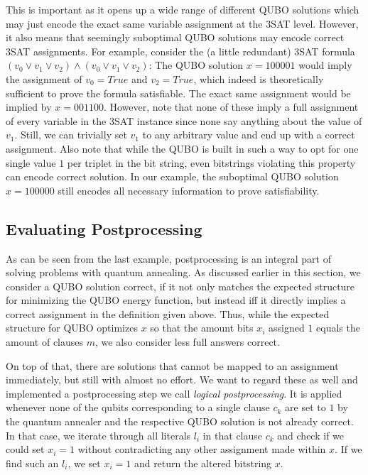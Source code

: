 This is important as it opens up a wide range of different QUBO solutions which may just encode the exact same variable assignment at the 3SAT level. However, it also means that seemingly suboptimal QUBO solutions may encode correct 3SAT assignments. For example, consider the (a little redundant) 3SAT formula $(v_0 \lor v_1 \lor v_2) \land (v_0 \lor v_1 \lor v_2)$: The QUBO solution $x = 100001$ would imply the assignment of $v_0 = \textit{True}$ and $v_2 = \textit{True}$, which indeed is theoretically sufficient to prove the formula satisfiable. The exact same assignment would be implied by $x = 001100$. However, note that none of these imply a full assignment of every variable in the 3SAT instance since none say anything about the value of $v_1$. Still, we can trivially set $v_1$ to any arbitrary value and end up with a correct assignment. Also note that while the QUBO is built in such a way to opt for one single value $1$ per triplet in the bit string, even bitstrings violating this property can encode correct solution. In our example, the suboptimal QUBO solution $x=100000$ still encodes all necessary information to prove satisfiability.

\subsection{Evaluating Postprocessing}

As can be seen from the last example, postprocessing is an integral part of solving problems with quantum annealing. As discussed earlier in this section, we consider a QUBO solution correct, if it not only matches the expected structure for minimizing the QUBO energy function, but instead iff it directly implies a correct assignment in the definition given above. Thus, while the expected structure for QUBO optimizes $x$ so that the amount bits $x_i$ assigned $1$ equals the amount of clauses $m$, we also consider less full answers correct.

On top of that, there are solutions that cannot be mapped to an assignment immediately, but still with almost no effort. We want to regard these as well and implemented a postprocessing step we call \emph{logical postprocessing}. It is applied whenever none of the qubits corresponding to a single clause $c_k$ are set to $1$ by the quantum annealer and the respective QUBO solution is not already correct. In that case, we iterate through all literals $l_i$ in that clause $c_k$ and check if we could set $x_i = 1$ without contradicting any other assignment made within $x$. If we find such an $l_i$, we set $x_i = 1$ and return the altered bitstring $x$.

